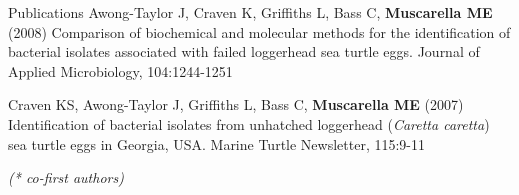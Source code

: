\documentclass{resume} %
\begin{document}
\begin{rSection}{Publications}
Awong-Taylor J, Craven K, Griffiths L, Bass C, {\bf Muscarella ME} (2008)
Comparison of biochemical and molecular methods for the identification of
bacterial isolates associated with failed loggerhead sea turtle eggs. Journal of
Applied Microbiology, 104:1244-1251

Craven KS, Awong-Taylor J, Griffiths L, Bass C, {\bf Muscarella ME} (2007)
Identification of bacterial isolates from unhatched loggerhead
({\em Caretta caretta}) sea turtle eggs in Georgia, USA.
Marine Turtle Newsletter, 115:9-11

{\em (* co-first authors)}

\end{rSection}

\pagebreak

\end{document}
